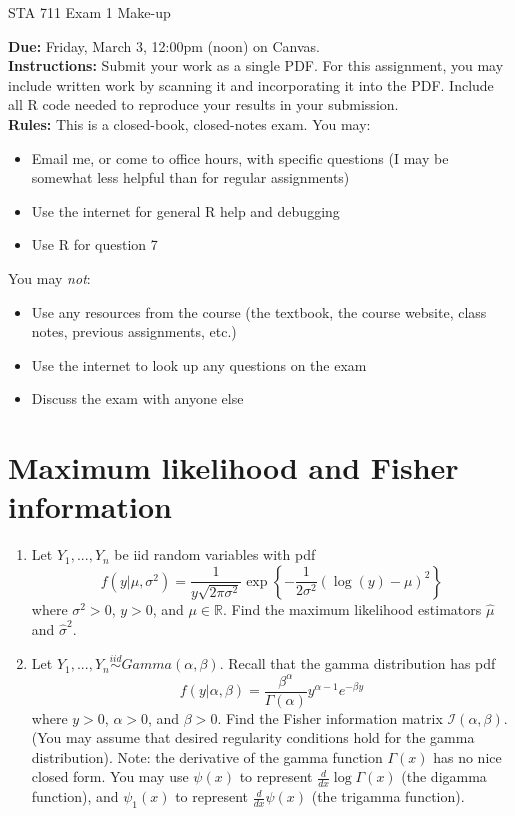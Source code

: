 \documentclass[11pt]{article}
\begin{document}
\begin{center}
\Large
STA 711 Exam 1 Make-up\\
\normalsize
\vspace{5mm}
\end{center}

\noindent \textbf{Due:} Friday, March 3, 12:00pm (noon) on Canvas.\\ 

\noindent \textbf{Instructions:} Submit your work as a single PDF. For this assignment, you may include written work by scanning it and incorporating it into the PDF. Include all R code needed to reproduce your results in your submission.\\

\noindent \textbf{Rules:} This is a closed-book, closed-notes exam. You may:
\begin{itemize}
\item Email me, or come to office hours, with specific questions (I may be somewhat less helpful than for regular assignments)
\item Use the internet for general R help and debugging
\item Use R for question 7
\end{itemize}
You may \textit{not}:
\begin{itemize}
\item Use any resources from the course (the textbook, the course website, class notes, previous assignments, etc.)
\item Use the internet to look up any questions on the exam
\item Discuss the exam with anyone else
\end{itemize}

\newpage

\section*{Maximum likelihood and Fisher information}

\begin{enumerate}
\item Let $Y_1,...,Y_n$ be iid random variables with pdf
$$f(y|\mu, \sigma^2) = \frac{1}{y \sqrt{2 \pi \sigma^2}} \exp \left\lbrace -\frac{1}{2\sigma^2}(\log(y) - \mu)^2 \right\rbrace$$
where $\sigma^2 > 0$, $y > 0$, and $\mu \in \mathbb{R}$. Find the maximum likelihood estimators $\widehat{\mu}$ and $\widehat{\sigma}^2$.

\item Let $Y_1,...,Y_n \overset{iid}{\sim} Gamma(\alpha, \beta)$. Recall that the gamma distribution has pdf
$$f(y|\alpha, \beta) = \dfrac{\beta^\alpha}{\Gamma(\alpha)} y^{\alpha - 1} e^{-\beta y}$$
where $y > 0$, $\alpha > 0$, and $\beta > 0$. Find the Fisher information matrix $\mathcal{I}(\alpha, \beta)$. (You may assume that desired regularity conditions hold for the gamma distribution). Note: the derivative of the gamma function $\Gamma(x)$ has no nice closed form. You may use $\psi(x)$ to represent $\frac{d}{dx} \log \Gamma(x)$ (the digamma function), and $\psi_1(x)$ to represent $\frac{d}{dx} \psi(x)$ (the trigamma function).

\end{enumerate}
\end{document}
